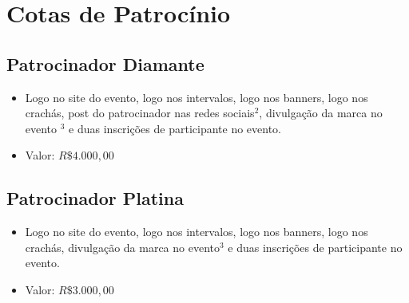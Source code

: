 \documentclass[12pt]{article}
\begin{document}

\section{Cotas de Patrocínio}
\subsection{Patrocinador Diamante}
  \begin{itemize}[label={}]
        \item Logo no site do evento, logo nos intervalos, logo nos banners, logo nos crachás, post do patrocinador nas redes sociais$^2$, divulgação da marca no evento $^3$ e duas inscrições de participante no evento.
        \item Valor: $R\$ 4.000,00$
  \end{itemize}
\subsection{Patrocinador Platina}
  \begin{itemize}[label={}]
        \item Logo no site do evento, logo nos intervalos, logo nos banners, logo nos crachás, divulgação da marca no evento$^3$ e duas inscrições de participante no evento.
        \item Valor: $R\$ 3.000,00$
  \end{itemize}
\end{document}

